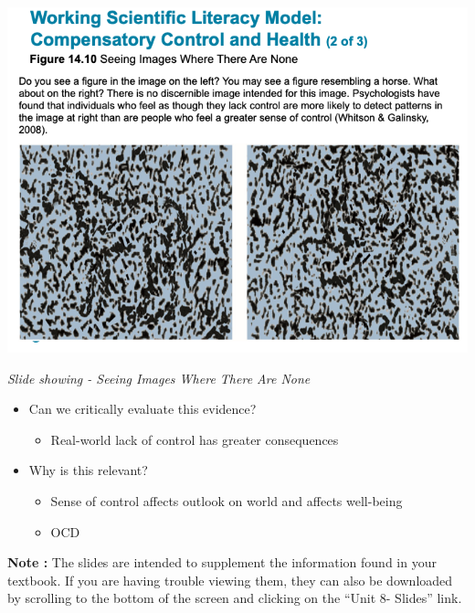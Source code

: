 \documentclass[
]{book}
\providecommand{\tightlist}{%
  \setlength{\itemsep}{0pt}\setlength{\parskip}{0pt}}
\begin{document}
\begin{reflect}
\includegraphics{assets/unit_8/slide_47.png}

\emph{Slide showing - Seeing Images Where There Are None}

\begin{itemize}
\tightlist
\item
  Can we critically evaluate this evidence?

  \begin{itemize}
  \tightlist
  \item
    Real-world lack of control has greater consequences\\
  \end{itemize}
\item
  Why is this relevant?

  \begin{itemize}
  \tightlist
  \item
    Sense of control affects outlook on world and affects well-being\\
  \item
    OCD
  \end{itemize}
\end{itemize}

\textbf{Note :} The slides are intended to supplement the information found in your textbook. If you are having trouble viewing them, they can also be downloaded by scrolling to the bottom of the screen and clicking on the ``Unit 8- Slides'' link.


\end{reflect}
\end{document}
